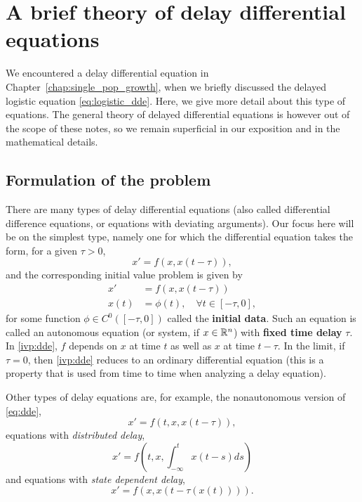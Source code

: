 \chapter{A brief theory of delay differential equations}
\label{chap:dde}

We encountered a delay differential equation in Chapter~\ref{chap:single_pop_growth}, when we briefly discussed the delayed logistic equation \eqref{eq:logistic_dde}. Here, we give more detail about this type of equations. The general theory of delayed differential equations is however out of the scope of these notes, so we remain superficial in our exposition and in the mathematical details.

\section{Formulation of the problem}
\label{sec:dde_ivp}
There are many types of delay differential equations (also called differential difference equations, or equations with deviating arguments). Our focus here will be on the simplest type, namely one for which the differential equation takes the form, for a given $\tau>0$,
\begin{equation}
\label{eq:dde}
x' = f(x,x(t-\tau)),
\end{equation}
and the corresponding initial value problem is given by
\begin{equation}
\label{ivp:dde}
\begin{aligned}
x' &= f(x,x(t-\tau)) \\
x(t) &= \phi(t),\quad \forall t\in[-\tau,0],
\end{aligned}
\end{equation}
for some function $\phi\in C^0([-\tau,0])$ called the \textbf{initial data}. Such an equation is called an autonomous equation (or system, if $x\in\mathbb{R}^n$) with \textbf{fixed time delay} $\tau$.
In \eqref{ivp:dde}, $f$ depends on $x$ at time $t$ as well as $x$ at time $t-\tau$. 
In the limit, if $\tau=0$, then \eqref{ivp:dde} reduces to an ordinary differential equation (this is a property that is used from time to time when analyzing a delay equation).

Other types of delay equations are, for example, the nonautonomous version of \eqref{eq:dde},
\[
x' = f(t,x,x(t-\tau)),
\]
equations with \emph{distributed delay},
\[
x' = f\left(t,x,\int_{-\infty}^tx(t-s)ds\right)
\]
and equations with \emph{state dependent delay},
\[
x' = f(x,x(t-\tau(x(t)))).
\]


